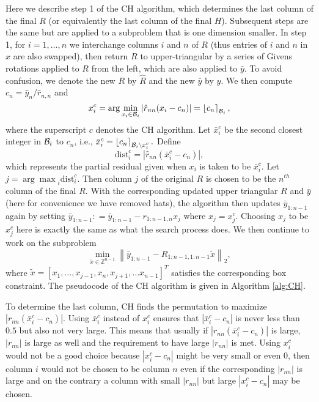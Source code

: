 \documentclass[12pt,Bold,letterpaper]{mcgilletdclass}
\newcommand{\be}{\begin{equation}}
\newcommand{\ee}{\end{equation}}
\newcommand{\dist}{\mathrm{dist}}
\begin{document}
Here we describe  step 1 of the CH algorithm, which determines the last column of the final $R$ 
(or equivalently the last column of the final $H$).
Subsequent steps are the same but are applied to a subproblem that is one dimension smaller. 
In step 1, for $i = 1,\dots,n$ we interchange
columns $i$ and $n$ of  $R$ (thus entries of $i$ and $n$ in $x$ are also swapped), then return $R$ to upper-triangular
by a series of Givens rotations applied to $R$ from the left, which  are also applied to $\bar{y}$.
To avoid confusion, we denote the new $R$ by $\hat{R}$ and the new $\bar{y}$ by $\hat{y}$.
We then compute  $c_n=\hat{y}_n/\hat{r}_{n,n}$ and 
\be
x_i^c=\arg\min_{x_i\in {\cal B}_i}\left |\hat{r}_{nn}(x_i- c_n) \right | = \left \lfloor c_n \right \rceil_{{\cal B}_i},
\label{eq:xic}
\ee
where the superscript $c$ denotes the CH algorithm. 
Let $\bar{x}_i^c$ be the second closest integer in ${{\cal B}_i}$ to $c_n$,
i.e.,  
$\bar{x}_i^c= \left \lfloor c_n \right \rceil_{{\cal B}_i\backslash x_i^c}.$
Define
\be
\dist_i^c = |\hat{r}_{nn}( \bar{x}_i^c -c_n) |, 
\label{eq:dic}
\ee
which represents the partial residual given when $x_i$ is taken to be $\bar{x}_i^c$.
Let $j = {\arg\max}_i \dist_i^c$.
Then  column $j$ of the original $R$ is chosen to be the $n^{th}$ column of the final $R$.
With the corresponding updated upper triangular $R$ and $\bar{y}$
(here for convenience we have removed hats),
the algorithm then updates  $\bar{y}_{1:n-1}$ again
by setting $\bar{y}_{1:n-1}: = \bar{y}_{1:n-1} - r_{1:n-1,n}x_j$ where $x_j=x_j^c$. 
Choosing  $x_j$ to be  $x_j^c$ here is exactly the same as what the search process does.
We then continue to work on the subproblem 
\be
\min_{\tilde{x}\in \mathbb{Z}^{n-1}} \left \| \bar{y}_{1:n-1}-R_{1:n-1,1:n-1}\tilde{x} \right \|_2,
\label{eq:subc}
\ee
where $\tilde{x}=[x_1,\ldots, x_{j-1}, x_n, x_{j+1}, \ldots x_{n-1}]^T$ satisfies the corresponding box constraint.
The pseudocode of the CH algorithm is given in Algorithm \ref{alg:CH}.

To determine the last column, CH finds the permutation to 
maximize $\left |r_{nn}(\bar{x}_i^c-c_n) \right |$. Using $\bar{x}_i^c$ instead of $x_i^c$
ensures that $\left | \bar{x}_i^c-c_n \right |$ is never less than $0.5$ but
also not very large. This means that usually if $\left | r_{nn}(\bar{x}_i^c-c_n)
\right |$ is large, $\left | r_{nn} \right |$ is large as well and the
requirement to have large $|r_{nn}|$ %
is met.
Using $x_i^c$ would not be a good choice because $\left | x_i^c - c_n \right |$ might be 
very small or even $0$, then column $i$ would not be chosen to be column $n$
even if the corresponding $|r_{nn}|$ is large and on the contrary a column with small $|r_{nn}|$
but large $|x_i^c-c_n|$ may be chosen. 
\end{document}
